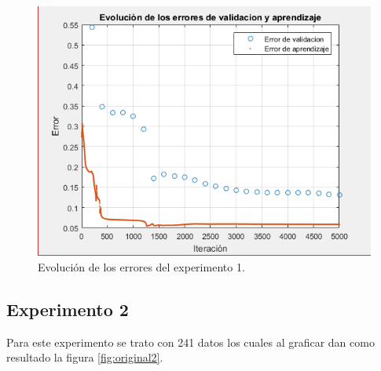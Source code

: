 \documentclass[12pt, titlepage]{article}
\begin{document}
\begin{figure}[H]
    \begin{center}
        \includegraphics[width=12cm]{1/error.png}
        \caption{Evolución de los errores del experimento 1.}
        \label{fig:error1}
    \end{center}
\end{figure}
\newpage

\subsection{Experimento 2}
Para este experimento se trato con 241 datos los cuales al graficar dan como resultado la figura \ref{fig:original2}.
\end{document}
